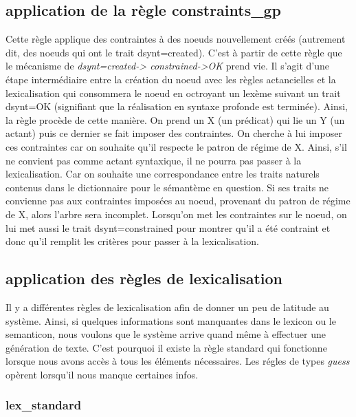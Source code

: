 \documentclass[12pt,maitrise,frenchb,natbib,twoside,initial]{dms}
\numberwithin{equation}{section}
\numberwithin{table}{chapter}
\numberwithin{figure}{chapter}
\begin{document}
\subsection{application de la règle constraints{\_}gp}
Cette règle applique des contraintes à des noeuds nouvellement créés (autrement dit, des noeuds qui ont le trait dsynt=created). C'est à partir de cette règle que le mécanisme de \emph{dsynt=created-> constrained->OK} prend vie. Il s'agit d'une étape intermédiaire entre la création du noeud avec les règles actancielles et la lexicalisation qui consommera le noeud en octroyant un lexème suivant un trait dsynt=OK (signifiant que la réalisation en syntaxe profonde est terminée). Ainsi, la règle procède de cette manière. On prend un X (un prédicat) qui lie un Y (un actant) puis ce dernier se fait imposer des contraintes. On cherche à lui imposer ces contraintes car on souhaite qu'il respecte le patron de régime de X. Ainsi, s'il ne convient pas comme actant syntaxique, il ne pourra pas passer à la lexicalisation. Car on souhaite une correspondance entre les traits naturels contenus dans le dictionnaire pour le sémantème en question. Si ses traits ne convienne pas aux contraintes imposées au noeud, provenant du patron de régime de X, alors l'arbre sera incomplet. Lorsqu'on met les contraintes sur le noeud, on lui met aussi le trait dsynt=constrained pour montrer qu'il a été contraint et donc qu'il remplit les critères pour passer à la lexicalisation.

\subsection{application des règles de lexicalisation}

Il y a différentes règles de lexicalisation afin de donner un peu de latitude au système. Ainsi, si quelques informations sont manquantes dans le lexicon ou le semanticon, nous voulons que le système arrive quand même à effectuer une génération de texte. C'est pourquoi il existe la règle standard qui fonctionne lorsque nous avons accès à tous les éléments nécessaires. Les régles de types \emph{guess} opèrent lorsqu'il nous manque certaines infos. 

\subsubsection{lex{\_}standard}
\end{document}

